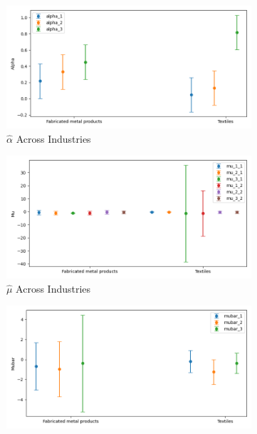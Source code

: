 \documentclass{article}
\begin{document}
\begin{figure}[ht!]
    \centering 
    \caption{AR(1) Mixture Model with $\log K$, Import and CIIU Across Industries}
    \begin{subfigure}[t]{0.32\textwidth}
        \centering
        \includegraphics[width=\textwidth]{figure/ar1_mixture_kmshare_ciiu_alpha_across_industries_m3.png}
        \caption{$\hat\alpha$ Across Industries}
    \end{subfigure}
    \begin{subfigure}[t]{0.32\textwidth}
        \centering
        \includegraphics[width=\textwidth]{figure/ar1_mixture_kmshare_ciiu_mu_across_industries_m3.png}
        \caption{$\hat\mu$ Across Industries}
    \end{subfigure}
    \begin{subfigure}[t]{0.32\textwidth}
        \centering
        \includegraphics[width=\textwidth]{figure/ar1_mixture_kmshare_ciiu_mubar_across_industries_m3.png}

\end{subfigure}
\end{figure}
\end{document}
